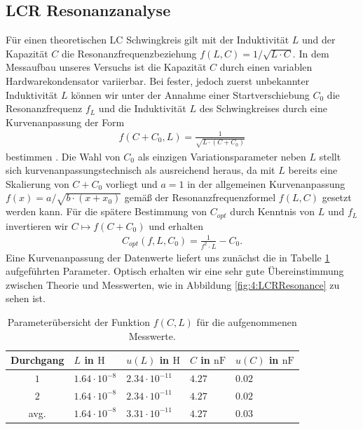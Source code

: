 \documentclass{article}
\begin{document}
    \subsection{LCR Resonanzanalyse}\label{subsec:4:LCRResonanzanalyse}
        Für einen theoretischen LC Schwingkreis gilt mit der Induktivität $L$ und der Kapazität $C$ die Resonanzfrequenzbeziehung $f(L,C) = 1/\sqrt{L\cdot C}$. In dem Messaufbau unseres Versuchs ist die Kapazität $C$ durch einen variablen Hardwarekondensator variierbar. Bei fester, jedoch zuerst unbekannter Induktivität $L$ können wir unter der Annahme einer Startverschiebung $C_0$ die Resonanzfrequenz $f_L$ und die Induktivität $L$ des Schwingkreises durch eine Kurvenanpassung der Form 
        \begin{align}
            f(C + C_0,L) = \frac{1}{\sqrt{L\cdot (C + C_0)}}
        \end{align}
        bestimmen \cite[ch 1.4.3]{doc:EFNMRStudentManual}. Die Wahl von $C_0$ als einzigen Variationsparameter neben $L$ stellt sich kurvenanpassungstechnisch als ausreichend heraus, da mit $L$ bereits eine Skalierung von $C + C_0$ vorliegt und $a=1$ in der allgemeinen Kurvenanpassung $f(x) = a / \sqrt{b\cdot (x + x_0)}$ gemäß der Resonanzfrequenzformel $f(L,C)$ gesetzt werden kann.
        Für die spätere Bestimmung von $C_{opt}$ durch Kenntnis von $L$ und $f_L$ invertieren wir $C\mapsto f(C + C_0)$ und erhalten 
        \begin{align}
            C_{opt}(f,L,C_0) = \frac{1}{f^2\cdot L} - C_0. \label{eq:4:Capacitance}
        \end{align}
        Eine Kurvenanpassung der Datenwerte liefert uns zunächst die in Tabelle \ref{tab:4:LCRResonance} aufgeführten Parameter. Optisch erhalten wir eine sehr gute Übereinstimmung zwischen Theorie und Messwerten, wie in Abbildung \ref{fig:4:LCRResonance} zu sehen ist.
        \begin{table}[H]
            \centering
            \begin{tabular}{c|ll|ll}
                 \textbf{Durchgang} & $L$ in $\si{\henry}$ & $u(L)$ in $\si{\henry}$ & $C$ in $\si{\nano\farad}$ & $u(C)$ in $\si{\nano\farad}$ \\
                \hline
                $1$ & $1.64\cdot 10^{-8}$ & $2.34\cdot 10^{-11}$ & $4.27$ & $0.02$ \\
                $2$ & $1.64\cdot 10^{-8}$ & $2.34\cdot 10^{-11}$ & $4.27$ & $0.02$ \\
                \hline
                avg. & $1.64\cdot 10^{-8}$ & $3.31\cdot 10^{-11}$ & $4.27$ & $0.03$
            \end{tabular} 
            \caption{Parameterübersicht der Funktion $f(C,L)$ für die aufgenommenen Messwerte.}
            \label{tab:4:LCRResonance}
        \end{table}
\end{document}
